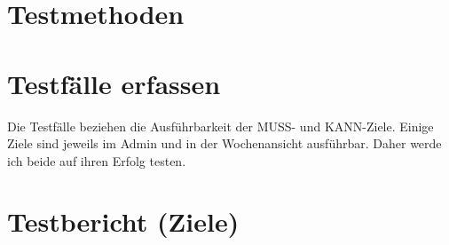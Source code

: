\section{Testmethoden}
\section{Testfälle erfassen}
Die Testfälle beziehen die Ausführbarkeit der MUSS- und KANN-Ziele.
Einige Ziele sind jeweils im Admin und in der Wochenansicht ausführbar. Daher werde ich beide auf ihren Erfolg testen.
\section{Testbericht (Ziele)}

